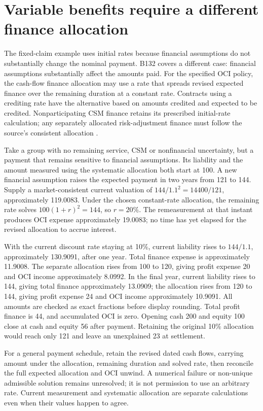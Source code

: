 \section{Variable benefits require a different finance allocation}
\label{sec:insurance-variable-finance}

The fixed-claim example uses initial rates because financial assumptions
do not substantially change the nominal payment. B132 covers a different
case: financial assumptions substantially affect the amounts paid. For the
specified OCI policy, the cash-flow finance allocation may use a rate that
spreads revised expected finance over the remaining duration at a constant
rate. Contracts using a crediting rate have the alternative based on
amounts credited and expected to be credited. Nonparticipating CSM finance
retains its prescribed initial-rate calculation; any separately allocated
risk-adjustment finance must follow the source's consistent allocation
\citep[IFRS~17.B130--132]{eu20231803}.

Take a group with no remaining service, CSM or nonfinancial uncertainty,
but a payment that remains sensitive to financial assumptions. Its liability
and the amount measured using the systematic allocation both start at 100.
A new financial assumption raises the expected payment in two years from
121 to 144. Supply a market-consistent current valuation of
\(144/1.1^2=14400/121\), approximately 119.0083. Under the chosen
constant-rate allocation, the remaining rate solves
\(100(1+r)^2=144\), so \(r=20\%\). The remeasurement at that instant
produces OCI expense approximately 19.0083; no time has yet elapsed for
the revised allocation to accrue interest.

With the current discount rate staying at 10\%, current liability rises
to \(144/1.1\), approximately 130.9091, after one year. Total finance
expense is approximately 11.9008. The separate allocation rises from 100
to 120, giving profit expense 20 and OCI income approximately 8.0992.
In the final year, current liability rises to 144, giving total finance
approximately 13.0909; the allocation rises from 120 to 144, giving profit
expense 24 and OCI income approximately 10.9091. All amounts are checked
as exact fractions before display rounding. Total profit finance is 44,
and accumulated OCI is zero. Opening cash 200 and equity 100 close at
cash and equity 56 after payment. Retaining the original 10\% allocation
would reach only 121 and leave an unexplained 23 at settlement.

For a general payment schedule, retain the revised dated cash flows,
carrying amount under the allocation, remaining duration and solved rate,
then reconcile the full expected allocation and OCI unwind. A numerical
failure or non-unique admissible solution remains unresolved; it is not
permission to use an arbitrary rate. Current measurement and systematic
allocation are separate calculations even when their values happen to agree.

